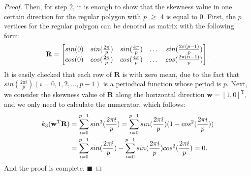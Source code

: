 \begin{proof}
	Then,  for  step 2,   it is  enough    to    show  that  the  skewness  value  in  one  certain  direction  for the   regular  polygon with $p$ $\ge $ 4  is  equal to  0. 
	First,  the  $p$  vertices  for  the  regular  polygon   can   be  denoted  as  matrix  with  the  following  form:
\begin{align}
\notag
\mathbf {R}
= 
\begin{bmatrix}
   sin(0)   &     sin(\frac  {2\pi } {p})  &   sin(\frac  {4\pi } {p})  & \dots   &  sin(\frac  {2\pi (p-1)} {p}) \\  
 cos(0)   &     cos(\frac  {2\pi } {p})  &  cos(\frac  {4\pi } {p})  &  \dots   &  cos(\frac  {2\pi (n-1)} {p})
\end{bmatrix} . 
\end{align}
It  is  easily  checked  that  each  row  of  $ \mathbf {R}$  is  with  zero  mean,   due  to  the  fact  
that  $sin(\frac  {2\pi i } {p}) (i=0,1,2,\dots, p-1)$  is a  periodical  function  whose  period is  $p$.
Next,  we   consider  the  skewness  value  of  $ \mathbf {R}$ along  the    horizontal  direction $ \mathbf  w =[1 ,  0]^{\mathrm T}$,   and  we  only need  to  calculate  the  numerator, which  follows:
\begin{align}
k_{3} (\mathbf  w^{\mathrm T}\mathbf {R})
\notag
&=
\sum\limits_{i=0}^{p-1}  sin^{3}(\frac  {2\pi i } {p})
=
 \sum\limits_{i=0}^{p-1}  sin(\frac  {2\pi i } {p}) (1-cos^{2}(\frac  {2\pi i } {p})) 
\\  \nonumber 
& =
 \sum\limits_{i=0}^{p-1}  sin(\frac  {2\pi i } {p}) -  \sum\limits_{i=0}^{p-1}  sin(\frac  {2\pi i } {p}) cos^{2}(\frac  {2\pi i } {p})
 =
 0. 
\end{align}
And  the  proof  is  complete. $\blacksquare$ 
\end{proof}
